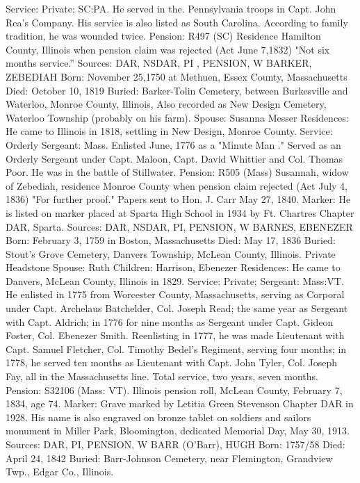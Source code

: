 Service: Private; SC:PA. He served in the. Pennsylvania troops in Capt. John Rea's Company. His service is also listed as South Carolina. According to family tradition, he was wounded twice. 
Pension: R497 (SC) Residence Hamilton County, Illinois when pension claim was rejected (Act June 7,1832) "Not six months service.” 
Sources: DAR, NSDAR, PI , PENSION, W 
BARKER, ZEBEDIAH 
Born: November 25,1750 at Methuen, Essex County, Massachusetts 
Died: October 10, 1819 
Buried: Barker-Tolin Cemetery, between Burkesville and Waterloo, Monroe County, Illinois, Also recorded as New Design Cemetery, Waterloo Township (probably on his farm). 
Spouse: Susanna Messer 
Residences: He came to Illinois in 1818, settling in New Design, Monroe County. 
Service: Orderly Sergeant: Mass. Enlisted June, 1776 as a "Minute Man ." Served as an Orderly Sergeant under Capt. Maloon, Capt. David Whittier and Col. Thomas Poor. He was in the battle of Stillwater. 
Pension: R505 (Mass) Susannah, widow of Zebediah, residence Monroe County when pension claim rejected (Act July 4, 1836) "For further proof." Papers sent to Hon. J. Carr May 27, 1840. 
Marker: He is listed on marker placed at Sparta High School in 1934 by Ft. Chartres Chapter DAR, Sparta. 
Sources: DAR, NSDAR, PI, PENSION, W 
BARNES, EBENEZER 
Born: February 3, 1759 in Boston, Massachusetts 
Died: May 17, 1836 
Buried: Stout's Grove Cemetery, Danvers Township, McLean County, Illinois. Private Headstone 
Spouse: Ruth Children: Harrison, Ebenezer Residences: He came to Danvers, McLean County, Illinois in 1829. 
Service: Private; Sergeant: Mass:VT. He enlisted in 1775 from Worcester County, Massachusetts, serving as Corporal under Capt. Archelaus Batchelder, Col. Joseph Read; the same year as Sergeant with Capt. Aldrich; in 1776 for nine months as Sergeant under Capt. Gideon Foster, Col. Ebenezer Smith. Re­enlisting in 1777, he was made Lieutenant with Capt. Samuel Fletcher, Col. Timothy Bedel's Regiment, serving four months; in 1778, he served ten months as Lieutenant with Capt. John Tyler, Col. Joseph Fay, all in the Massachusetts line. Total service, two years, seven months. 
Pension: S32106 (Mass: VT). Illinois pension roll, McLean County, February 7, 1834, age 74. 
Marker: Grave marked by Letitia Green Stevenson Chapter DAR in 1928. His name is also engraved on bronze tablet on soldiers and sailors monument in Miller Park, Bloomington, dedicated Memorial Day, May 30, 1913. 
Sources: DAR, PI, PENSION, W 
BARR (O'Barr), HUGH 
Born: 1757/58 
Died: April 24, 1842 
Buried: Barr-Johnson Cemetery, near Flemington, Grandview Twp., Edgar Co., Illinois. 
